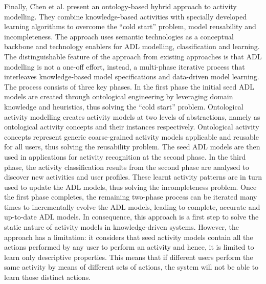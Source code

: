 Finally, Chen et al. \cite{Chen2014} present an ontology-based hybrid approach to activity modelling. They combine knowledge-based activities with specially developed learning algorithms to overcome the ``cold start'' problem, model reusability and incompleteness. The approach uses semantic technologies as a conceptual backbone and technology enablers for ADL modelling, classification and learning. The distinguishable feature of the approach from existing approaches is that ADL modelling is not a one-off effort, instead, a multi-phase iterative process that interleaves knowledge-based model specifications and data-driven model learning. The process consists of three key phases. In the first phase the initial seed ADL models are created through ontological engineering by leveraging domain knowledge and heuristics, thus solving the ``cold start'' problem. Ontological activity modelling creates activity models at two levels of abstractions, namely as ontological activity concepts and their instances respectively. Ontological activity concepts represent generic coarse-grained activity models applicable and reusable for all users, thus solving the reusability problem. The seed ADL models are then used in applications for activity recognition at the second phase. In the third phase, the activity classification results from the second phase are analysed to discover new activities and user profiles. These learnt activity patterns are in turn used to update the ADL models, thus solving the incompleteness problem. Once the first phase completes, the remaining two-phase process can be iterated many times to incrementally evolve the ADL models, leading to complete, accurate and up-to-date ADL models. In consequence, this approach is a first step to solve the static nature of activity models in knowledge-driven systems. However, the approach has a limitation: it considers that seed activity models contain all the actions performed by any user to perform an activity and hence, it is limited to learn only descriptive properties. This means that if different users perform the same activity by means of different sets of actions, the system will not be able to learn those distinct actions. 